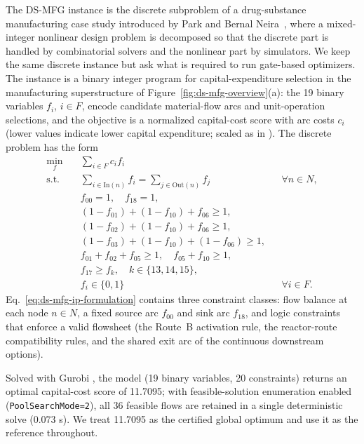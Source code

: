 \documentclass[10pt,letterpaper]{article}
\begin{document}
The DS-MFG instance is the discrete subproblem of a drug-substance manufacturing case study introduced by Park and Bernal Neira~\cite{park2026arxiv}, where a mixed-integer nonlinear design problem is decomposed so that the discrete part is handled by combinatorial solvers and the nonlinear part by simulators.
We keep the same discrete instance but ask what is required to run gate-based optimizers.
The instance is a binary integer program for capital-expenditure selection in the manufacturing superstructure of Figure~\ref{fig:ds-mfg-overview}(a): the 19 binary variables $f_i$, $i \in F$, encode candidate material-flow arcs and unit-operation selections, and the objective is a normalized capital-cost score with arc costs $c_i$ (lower values indicate lower capital expenditure; scaled as in \cite{park2026arxiv}).
The discrete problem has the form
\begin{equation}
\begin{aligned}
\min_{f} \quad & \sum_{i \in F} c_i f_i \\
\text{s.t.}\quad
& \sum_{i \in \mathrm{In}(n)} f_i
  = \sum_{j \in \mathrm{Out}(n)} f_j
    && \forall n \in N, \\
& f_{00} = 1,\quad f_{18} = 1,\\
& (1-f_{01}) + (1-f_{10}) + f_{06} \geq 1,\\
& (1-f_{02}) + (1-f_{10}) + f_{06} \geq 1,\\
& (1-f_{03}) + (1-f_{10}) + (1-f_{06}) \geq 1,\\
& f_{01} + f_{02} + f_{05} \geq 1,\quad f_{05} + f_{10} \geq 1,\\
& f_{17} \geq f_{k},\quad k \in \{13,14,15\},\\
& f_i \in \{0,1\}
    && \forall i \in F .
\end{aligned}
\label{eq:ds-mfg-ip-formulation}
\end{equation}
Eq.~\eqref{eq:ds-mfg-ip-formulation} contains three constraint classes: flow balance at each node $n \in N$, a fixed source arc $f_{00}$ and sink arc $f_{18}$, and logic constraints that enforce a valid flowsheet (the Route~B activation rule, the reactor-route compatibility rules, and the shared exit arc of the continuous downstream options).

Solved with Gurobi \cite{gurobi}, the model (19 binary variables, 20 constraints) returns an optimal capital-cost score of 11.7095; with feasible-solution enumeration enabled (\texttt{PoolSearchMode=2}), all 36 feasible flows are retained in a single deterministic solve (0.073 s).
We treat 11.7095 as the certified global optimum and use it as the reference throughout.
\end{document}
